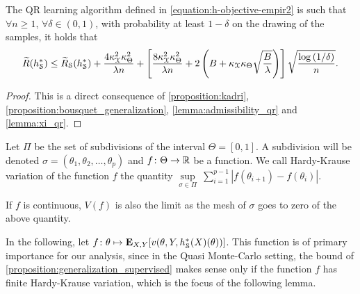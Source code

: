 \begin{corollary} \label{corollary:beta_stab_qr}
  The \ac{QR} learning algorithm defined in \cref{equation:h-objective-empir2}
  is such that
  $\forall n \geq 1$, $\forall \delta \in (0,1)$,
  with probability at least $1-\delta$ on the drawing of the samples, it
  holds that
  \begin{dmath} \label{equation:beta_stab_qr}
    \widetilde{\risk}(\minimizer{h}_{\trainingset}) \leq
    \sampledempiricalrisk(\minimizer{h}_{\trainingset})
    + \frac{4 \kappa_{\mcX}^2 \kappa_{\hyperparameterspace}^2}{ \lambda n} +
    \left[\frac{8 \kappa_{\mcX}^2 \kappa_{\hyperparameterspace}^2}{ \lambda n} +
    2\left(B + \kappa_{\mcX} \kappa_{\hyperparameterspace} \sqrt{\frac{B}{\lambda}} \right)\right]
    \sqrt{\frac{\log{(1/\delta)}}{n}}.
  \end{dmath}
  \begin{proof} This is a direct consequence of \cref{proposition:kadri},
    \cref{proposition:bousquet_generalization}, \cref{lemma:admissibility_qr} and
    \cref{lemma:xi_qr}.
  \end{proof}
\end{corollary}

\begin{definition} Let $\Pi$ be the set of subdivisions of the interval $\Theta = [0,1]$.
  A subdivision will be denoted $\sigma = (\theta_1,\theta_2,\ldots,\theta_p)$
  and $f \colon \Theta \to \mathbb{R}$ be a function.
  We call Hardy-Krause variation of the function $f$ the quantity
    $\underset{\sigma \in \Pi}{\sup} ~ \sum_{i=1}^{p-1} |f(\theta_{i+1}) - f(\theta_i)|$.
\end{definition}
\begin{remark} \label{remark:continuity_mesh}
  If $f$ is continuous, $V(f)$ is also the limit as the mesh of $\sigma$ goes to zero
  of the above quantity.
\end{remark}

In the following, let $f \colon \theta \mapsto \mathbf{{E}}_{X,Y}[
  v(\theta,Y, h^{*}_{\mathcal{S}}(X)(\theta))]$.
  This function is of primary importance for our analysis, since in the
  Quasi Monte-Carlo setting, the bound of \cref{proposition:generalization_supervised}
  makes sense only if the function $f$ has finite Hardy-Krause variation, which is
  the focus of the following lemma.

